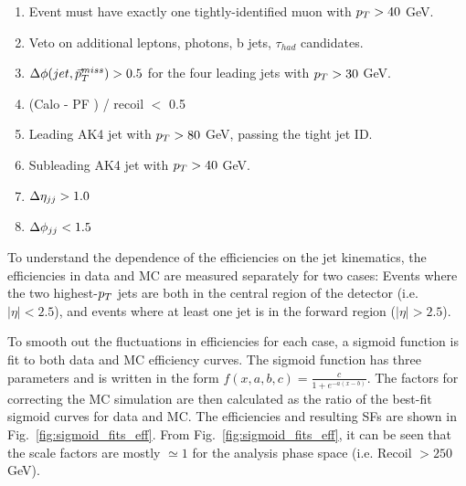 \begin{enumerate}
    \item Event must have exactly one tightly-identified muon with $p_T > 40$ GeV.
    \item Veto on additional leptons, photons, b jets, $\tau_{had}$ candidates.
    \item $\Delta\phi(jet,\vec{p}_{T}^{miss})>0.5$ for the four leading jets with $p_T>30$ GeV.
    \item (Calo \ptmiss - PF \ptmiss) / recoil $<$ 0.5
    \item Leading AK4 jet with $p_T>80$ GeV, passing the tight jet ID.
    \item Subleading AK4 jet with $p_T>40$ GeV.
    \item $\Delta \eta_{jj} > 1.0$
    \item $\Delta \phi_{jj} < 1.5$
\end{enumerate}

To understand the dependence of the efficiencies on the jet kinematics, the efficiencies in data and MC are measured 
separately for two cases: Events where the two highest-$p_T$ jets are both in the central region of the detector (i.e. $|\eta| < 2.5$), 
and events where at least one jet is in the forward region ($|\eta| > 2.5$).

To smooth out the fluctuations in efficiencies for each case, a sigmoid function is fit to both data and MC 
efficiency curves. The sigmoid function has three parameters and is written in the form $f(x,a,b,c) = \frac{c}{1+e^{-a(x-b)}}$. 
The factors for correcting the MC simulation are then calculated as the ratio of the best-fit sigmoid curves for data and MC.
The efficiencies and resulting SFs are shown in Fig.~\ref{fig:sigmoid_fits_eff}. From Fig.~\ref{fig:sigmoid_fits_eff}, 
it can be seen that the scale factors are mostly $\simeq 1$ for the analysis phase space (i.e. Recoil $> 250$ GeV).

